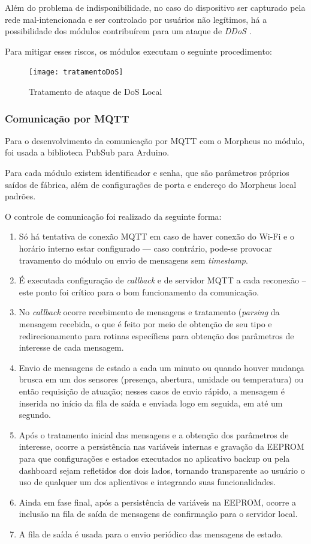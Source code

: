 Além do problema de indisponibilidade, no caso do dispositivo ser capturado pela rede mal-intencionada e ser controlado por usuários não legítimos, há a possibilidade dos módulos contribuírem para um ataque de \textit{DDoS} \cite{OVHDDoS}.

Para mitigar esses riscos, os módulos executam o seguinte procedimento:

\begin{figure}[H]
	\centering
	\caption{Tratamento de ataque de DoS Local}
  \texttt{[image: tratamentoDoS]}
\label{fig:tratamentoDoS}
\end{figure}

\subsubsection{Comunicação por MQTT}
Para o desenvolvimento da comunicação por MQTT com o Morpheus no módulo, foi usada a biblioteca PubSub para Arduino.

Para cada módulo existem identificador e senha, que são parâmetros próprios saídos de fábrica, além de configurações de porta e endereço do Morpheus local padrões.

O controle de comunicação foi realizado da seguinte forma:

\begin{enumerate}
	\item Só há tentativa de conexão MQTT em caso de haver conexão do Wi-Fi e o horário interno estar configurado --- caso contrário, pode-se provocar travamento do módulo ou envio de mensagens sem \emph{timestamp}.
	\item É executada configuração de \emph{callback} e de servidor MQTT a cada reconexão -- este ponto foi crítico para o bom funcionamento da comunicação.
	\item No \emph{callback} ocorre recebimento de mensagens e tratamento (\emph{parsing} da mensagem recebida, o que é feito por meio de obtenção de seu tipo e redirecionamento para rotinas específicas para obtenção dos parâmetros de interesse de cada mensagem.
	\item Envio de mensagens de estado a cada um minuto ou quando houver mudança brusca em um dos sensores (presença, abertura, umidade ou temperatura) ou então requisição de atuação; nesses casos de envio rápido, a mensagem é inserida no início da fila de saída e enviada logo em seguida, em até um segundo.
	\item Após o tratamento inicial das mensagens e a obtenção dos parâmetros de interesse, ocorre a persistência nas variáveis internas e gravação da EEPROM para que configurações e estados executados no aplicativo backup ou pela dashboard sejam refletidos dos dois lados, tornando transparente ao usuário o uso de qualquer um dos aplicativos e integrando suas funcionalidades.
	\item Ainda em fase final, após a persistência de variáveis na EEPROM, ocorre a inclusão na fila de saída de mensagens de confirmação para o servidor local.
	\item A fila de saída é usada para o envio periódico das mensagens de estado.
\end{enumerate}

